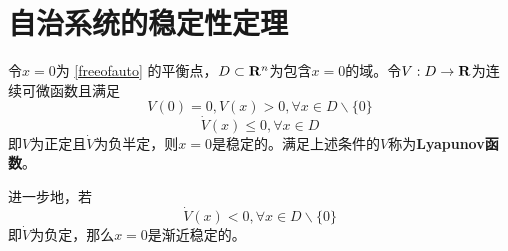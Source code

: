 \section{自治系统的稳定性定理}\label{2Cref}
\begin{theorem}[Lyapunov稳定性定理]\label{lyapunov}
  令$x=0$为 \eqref{freeofauto} 的平衡点，$D\subset\mathbf{R}{}^n$为包含$x=0$的域。令$V:D\to\mathbf{R}$为连续可微函数且满足
    \begin{equation}\label{VPD}
      V(0)=0,V(x)>0,\forall x\in D\backslash\{0\}
    \end{equation}
    \begin{equation}\label{VdotNSD}
      \dot{V}(x)\le 0,\forall x\in D
    \end{equation}
  即$V$为正定且$\dot{V}$为负半定，则$x=0$是稳定的。满足上述条件的$V$称为{\bf Lyapunov函数}。
  
  进一步地，若\begin{equation}\label{VdotND}
    \dot{V}(x)< 0,\forall x\in D\backslash\{0\}
  \end{equation}即$\dot{V}$为负定，那么$x=0$是渐近稳定的。
\end{theorem}


